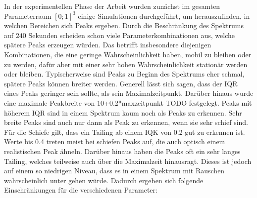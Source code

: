 In der experimentellen Phase der Arbeit wurden zunächst im gesamten Parameterraum $[0;1]^3$ einige Simulationen durchgeführt, um herauszufinden, in welchen Bereichen sich Peaks ergeben. 
Durch die Beschränkung des Spektrums auf $240$ Sekunden scheiden schon viele Parameterkombinationen aus, welche spätere Peaks erzeugen würden. Das betrifft insbesondere diejenigen Kombinationen, die eine geringe Wahrscheinlichkeit haben, mobil zu bleiben oder zu werden, dafür aber mit einer sehr hohen Wahrscheinlichkeit stationär werden oder bleiben. 
Typischerweise sind Peaks zu Beginn des Spektrums eher schmal, spätere Peaks können breiter werden. Generell lässt sich sagen, dass der IQR eines Peaks geringer sein sollte, als sein Maximalzeitpunkt. Darüber hinaus wurde eine maximale Peakbreite von 10+0.2*maxzeitpunkt TODO festgelegt. Peaks mit höherem IQR sind in einem Spektrum kaum noch als Peaks zu erkennen.
Sehr breite Peaks sind auch nur dann als Peak zu erkennen, wenn sie sehr schief sind.
Für die Schiefe gilt, dass ein Tailing ab einem IQK von 0.2 gut zu erkennen ist. Werte bis 0.4 treten meist bei schiefen Peaks auf, die auch optisch einem realistischen Peak ähneln. Darüber hinaus haben die Peaks oft ein sehr langes Tailing, welches teilweise auch über die Maximalzeit hinausragt. Dieses ist jedoch auf einem so niedrigen Niveau, dass es in einem Spektrum mit Rauschen wahrscheinlich unter gehen würde.
Dadurch ergeben sich folgende Einschränkungen für die verschiedenen Parameter:
